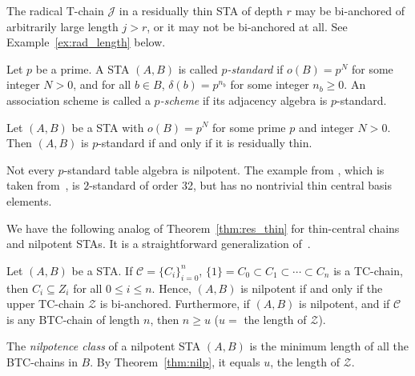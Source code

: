 \begin{rema}
\label{rem:res_v_rad}
The radical T-chain $\mathcal{J}$ in a residually thin STA of depth $r$
may be bi-anchored of arbitrarily large length $j > r$, or it may not be
bi-anchored at all. See Example~\ref{ex:rad_length} below.
\end{rema}

\begin{defi}
\label{def_p-standard}
\cite [Definition~1.4]{BC} Let $p$ be a prime. A STA $(A, B)$ is called
\emph{$p$-standard} if $o(B) = p^N$ for some integer $N > 0$, and for
all $b \in B$, $\delta(b) = p^{n_b}$ for some integer $n_b \geq 0$. An
association scheme is called a \emph{$p$-scheme} if its adjacency
algebra is $p$-standard.
\end{defi}

\begin{prop}
\label{prop:p-stan_res_thin}
Let $(A, B)$ be a STA with $o(B) = p^N$ for some prime $p$ and integer
$N > 0$. Then $(A, B)$ is $p$-standard if and only if it is residually
thin.
\end{prop}

\begin{rema}
\label{rem:p-standard}
Not every $p$-standard table algebra is nilpotent. The example from
\cite [Remark~1.4]{BC}, which is taken from~\cite [No.10851]{HM}, is
$2$-standard of order 32, but has no nontrivial thin central basis elements.
\end{rema} 
 
We have the following analog of Theorem~\ref{thm:res_thin} for
thin-central chains and nilpotent STAs. It is a straightforward
generalization of~\cite [Theorem~2.5]{H}. 

\begin{thm}
\label{thm:nilp}
Let $(A, B)$ be a STA. If $\mathcal{C} = \{C_i\}_{i=0}^n$, $\{1\} = C_0
\subset C_1 \subset \cdots \subset C_n$ is a TC-chain, then $C_i
\subseteq Z_i$ for all $0 \leq i \leq n$. Hence, $(A, B)$ is nilpotent
if and only if the upper TC-chain $\mathcal{Z}$ is bi-anchored.
Furthermore, if $(A, B)$ is nilpotent, and if $\mathcal{C}$ is any
BTC-chain of length $n$, then $n \geq u$ \textup{(}$u =$ the length of
$\mathcal{Z}$\textup{)}.
\end{thm}

\begin{defi}
\label{def:class} 
The \emph{nilpotence class} of a nilpotent STA $(A, B)$ is the minimum
length of all the BTC-chains in $B$. By Theorem~\ref{thm:nilp}, it
equals $u$, the length of $\mathcal{Z}$.
\end{defi} 

